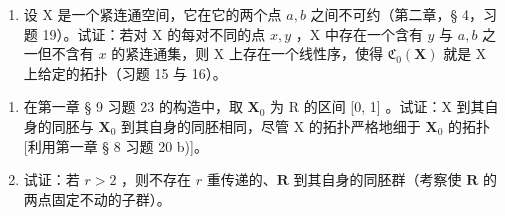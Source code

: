 \begin{enumerate}
\def\labelenumi{\alph{enumi})}
\setcounter{enumi}{1}
\tightlist
\item
设 X 是一个紧连通空间，它在它的两个点 \(a, b\) 之间不可约（第二章，§ 4，习题 19）。试证：若对 X 的每对不同的点 \(x, y\) ，X 中存在一个含有 \(y\) 与 \(a, b\) 之一但不含有 \(x\) 的紧连通集，则 X 上存在一个线性序，使得 \(\mathfrak{C}_{0}(\mathbf{X})\) 就是 X 上给定的拓扑（习题 15 与 16）。
\end{enumerate}

\begin{enumerate}
\def\labelenumi{\arabic{enumi})}
\setcounter{enumi}{19}
\item
在第一章 § 9 习题 23 的构造中，取 \(\mathbf{X}_0\) 为 R 的区间 {[}0, 1{]} 。试证：X 到其自身的同胚与 \(\mathbf{X}_0\) 到其自身的同胚相同，尽管 X 的拓扑严格地细于 \(\mathbf{X}_0\) 的拓扑{[}利用第一章 § 8 习题 20 b){]}。
\item
试证：若 \(r > 2\) ，则不存在 \(r\) 重传递的、\(\mathbf{R}\) 到其自身的同胚群（考察使 \(\mathbf{R}\) 的两点固定不动的子群）。
\end{enumerate}

